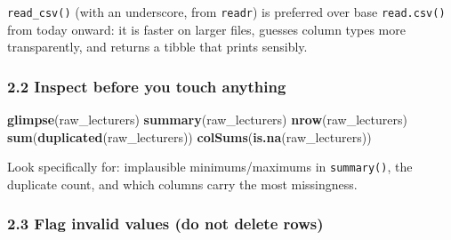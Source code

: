 \documentclass[11pt]{article}
\newenvironment{Shaded}{\begin{snugshade}}{\end{snugshade}}
\newcommand{\FunctionTok}[1]{\textcolor[rgb]{0.13,0.29,0.53}{\textbf{#1}}}
\newcommand{\NormalTok}[1]{#1}
\begin{document}
\texttt{read\_csv()} (with an underscore, from \texttt{readr}) is
preferred over base \texttt{read.csv()} from today onward: it is faster
on larger files, guesses column types more transparently, and returns a
tibble that prints sensibly.

\hypertarget{inspect-before-you-touch-anything}{%
\subsubsection{2.2 Inspect before you touch
anything}\label{inspect-before-you-touch-anything}}

\begin{Shaded}
\begin{Highlighting}[]
\FunctionTok{glimpse}\NormalTok{(raw\_lecturers)}
\FunctionTok{summary}\NormalTok{(raw\_lecturers)}
\FunctionTok{nrow}\NormalTok{(raw\_lecturers)}
\FunctionTok{sum}\NormalTok{(}\FunctionTok{duplicated}\NormalTok{(raw\_lecturers))}
\FunctionTok{colSums}\NormalTok{(}\FunctionTok{is.na}\NormalTok{(raw\_lecturers))}
\end{Highlighting}
\end{Shaded}

Look specifically for: implausible minimums/maximums in
\texttt{summary()}, the duplicate count, and which columns carry the
most missingness.

\hypertarget{flag-invalid-values-do-not-delete-rows}{%
\subsubsection{2.3 Flag invalid values (do not delete
rows)}\label{flag-invalid-values-do-not-delete-rows}}
\end{document}
